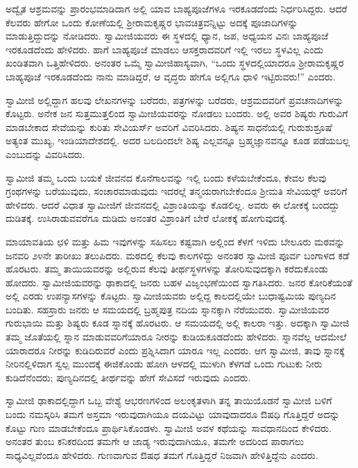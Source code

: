  ಅದ್ವೈತ ಆಶ್ರಮವನ್ನು ಪ್ರಾರಂಭಮಾಡಿದಾಗ ಅಲ್ಲಿ ಯಾವ ಬಾಹ್ಯಪೂಜೆಗಳೂ ಇರಕೂಡದೆಂದು ನಿರ್ಧರಿಸಿದ್ದರು. ಆದರೆ ಕೆಲವರು ಹೇಗೋ ಒಂದು ಕೋಣೆಯಲ್ಲಿ ಶ‍್ರೀರಾಮಕೃಷ್ಣರ ಭಾವಚಿತ್ರವನ್ನಿಟ್ಟು ಅದಕ್ಕೆ ಪೂಜಾದಿಗಳನ್ನು ಮಾಡುತ್ತಿದ್ದುದನ್ನು ನೋಡಿದರು. ಸ್ವಾಮೀಜಿಯವರು ಈ ಸ್ಥಳದಲ್ಲಿ ಧ್ಯಾನ, ಜಪ, ಅಧ್ಯಯನ ವಿನಃ ಬಾಹ್ಯಪೂಜೆ ಇರಕೂಡದೆಂದು ಹೇಳಿದರು. ಹಾಗೆ ಬಾಹ್ಯಪೂಜೆ ಮಾಡಲು ಆಸಕ್ತರಾದವರಿಗೆ ಇಲ್ಲಿ ಇರಲು ಸ್ಥಳವಿಲ್ಲ ಎಂದು ಖಂಡಿತವಾಗಿ ಒತ್ತಿಹೇಳಿದರು. ಅನಂತರ ಒಮ್ಮೆ ಸ್ವಾಮೀಜಿ\break ಹಾಸ್ಯವಾಗಿ, “ಒಂದು ಸ್ಥಳದಲ್ಲಿಯಾದರೂ ಶ‍್ರೀರಾಮಕೃಷ್ಣರ ಬಾಹ್ಯಪೂಜೆ ಇರಕೂಡದೆಂದು ನಾನು ಮಾಡಿದ್ದರೆ, ಆ ವೃದ್ಧರು ಹೇಗೊ ಅಲ್ಲಿಗೂ ಧಾಳಿ ಇಟ್ಟಿರುವರು!” ಎಂದರು. 

 ಸ್ವಾಮೀಜಿ ಅಲ್ಲಿದ್ದಾಗ ಹಲವು ಲೇಖನಗಳನ್ನು ಬರೆದರು, ಪತ್ರಗಳನ್ನು ಬರೆದರು, ಆಶ್ರಮದವರಿಗೆ ಪ್ರವಚನಾದಿಗಳನ್ನು ಕೊಟ್ಟರು. ಅನೇಕ ಜನ ಸುತ್ತಮುತ್ತಲಿಂದ ಸ್ವಾಮೀಜಿಯವರನ್ನು ನೋಡಲು ಬಂದರು. ಅಲ್ಲಿ ಅವರ ಶಿಷ್ಯರು ಗುರುವಿಗೆ ಮಾಡಬೇಕಾದ ಸೇವೆಯನ್ನು ಕುರಿತು ಸೇವಿಯರ್ಸ್ ಅವರಿಗೆ ವಿವರಿಸಿದರು. ಶಿಷ್ಯನ ಸಾಧನೆಯಲ್ಲಿ ಗುರುಶುಶ್ರೂಷೆ ಅತ್ಯಂತ ಮುಖ್ಯ, ಇಂಡಿಯಾದೇಶದಲ್ಲಿ. ಅದರ ಬಲದಿಂದಲೇ ಶಿಷ್ಯ ಎಲ್ಲವನ್ನೂ ಬ್ರಹ್ಮಜ್ಞಾನವನ್ನೂ ಕೂಡ ಪಡೆಯಬಲ್ಲ ಎಂಬುದನ್ನು ವಿವರಿಸಿದರು. 

 ಸ್ವಾಮೀಜಿ ತಮ್ಮ ಒಂದು ಬಯಕೆ ಜೀವನದ ಕೊನೆಗಾಲವನ್ನು ಇಲ್ಲಿ ಬಂದು ಕಳೆಯಬೇಕೆಂದೂ, ಕೇವಲ ಕೆಲವು ಗ್ರಂಥಗಳನ್ನು ಬರೆಯುವುದು, ಸಂಚಾರಮಾಡುವುದು ಇದರಲ್ಲೆ ತನ್ಮಯರಾಗಬೇಕೆಂದೂ ಶ‍್ರೀಮತಿ ಸೇವಿಯರ್ಸ್‍‍ ಅವರಿಗೆ ಹೇಳಿದರು. ಆದರೆ ವಿಧಾತ ಸ್ವಾಮೀಜಿಗೆ ಜೀವನದಲ್ಲಿ ವಿಶ್ರಾಂತಿಯನ್ನು ಕೊಡಲಿಲ್ಲ. ಅವರು ಈ ಲೋಕಕ್ಕೆ ಬಂದದ್ದು ದುಡಿತಕ್ಕೆ. ಉಸಿರಾಡುವವರೆಗೂ ದುಡಿದು ಅನಂತರ ವಿಶ್ರಾಂತಿಗೆ ಬೇರೆ ಲೋಕಕ್ಕೆ ಹೋಗುವುದಕ್ಕೆ. 

 ಮಾಯಾವತಿಯ ಛಳಿ ಮತ್ತು ಹಿಮ ಇವುಗಳನ್ನು ಸಹಿಸಲು ಕಷ್ಟವಾಗಿ ಅಲ್ಲಿಂದ ಕೆಳಗೆ ಇಳಿದು ಬೇಲೂರು ಮಠವನ್ನು ಜನವರಿ ೨೪ನೇ ತಾರೀಖು ತಲುಪಿದರು. ಮಠದಲ್ಲಿ ಕೆಲವು ಕಾಲಗಳಿದ್ದು ಅನಂತರ ಸ್ವಾಮೀಜಿ ಪೂರ್ವ ಬಂಗಾಳದ ಕಡೆ ಹೊರಟರು. ತಮ್ಮ ತಾಯಿಯವರನ್ನು ಅಲ್ಲಿರುವ ಕೆಲವು ತೀರ್ಥಸ್ಥಳಗಳನ್ನು ತೋರಿಸುವುದಕ್ಕಾಗಿ ಕರೆದುಕೊಂಡು ಹೋದರು. ಸ್ವಾಮೀಜಿಯವರನ್ನು ಢಾಕಾದಲ್ಲಿ ಜನರು ಬಹಳ ವಿಜೃಂಭಣೆಯಿಂದ ಸ್ವಾಗತಿಸಿದರು. ಜನರ ಕೋರಿಕೆಯಂತೆ ಅಲ್ಲಿ ಎರಡು ಉಪನ್ಯಾಸಗಳನ್ನು ಕೊಟ್ಟರು. ಸ್ವಾಮೀಜಿಯವರು ಅಲ್ಲಿದ್ದ ಕಾಲದಲ್ಲಿಯೇ ಬುಧಾಷ್ಟಮಿಯ ಪುಣ್ಯದಿನ ಬಂದಿತು. ಸಹಸ್ರಾರು ಜನರು ಆ ಸಮಯದಲ್ಲಿ ಬ್ರಹ್ಮಪುತ್ರ ನದಿಯ ಸ್ನಾನಕ್ಕಾಗಿ ನೆರೆಯುವರು. ಸ್ವಾಮೀಜಿಯವರ ಗುರುಭಾಯಿ ಮತ್ತು ಶಿಷ್ಯರು ಕೂಡ ಸ್ನಾನಕ್ಕೆ ಹೊರಟರು. ಆ ಸಮಯದಲ್ಲಿ ಅಲ್ಲಿ ಕಾಲರಾ ಇತ್ತು. ಅದಕ್ಕಾಗಿ ಸ್ವಾಮೀಜಿ ತಮ್ಮ ಜೊತೆಯಲ್ಲಿ ಸ್ನಾನ ಮಾಡುವವರಿಗೆ\break ಯಾರೂ ನೀರನ್ನು ಕುಡಿಯಕೂಡದೆಂದು ಹೇಳಿದರು. ಸ್ನಾನವೆಲ್ಲ ಆದಮೇಲೆ ಯಾರಾದರೂ ನೀರನ್ನು ಕುಡಿದಿರುವರೆ ಎಂದು ಪ್ರಶ್ನಿಸಿದಾಗ ಯಾರೂ ಇಲ್ಲ ಎಂದರು. ಆಗ ಸ್ವಾಮೀಜಿ, ತಾವು ಸ್ನಾನಕ್ಕೆ ನೀರಿನಲ್ಲಿಳಿದಾಗ ಸ್ವಲ್ಪ ಮುಂದಕ್ಕೆ ಈಜಿಕೊಂಡು ಹೋಗಿ ಆಳದಲ್ಲಿ ಮುಳುಗಿ ಕೆಳಗಡೆ ಒಂದು ಗುಟುಕು ನೀರು ಕುಡಿದೆನೆಂದರು; ಪುಣ್ಯದಿನದಲ್ಲಿ ತೀರ್ಥವನ್ನು ಹೇಗೆ ಸೇವಿಸದೆ ಇರುವುದು ಎಂದರು. 

 ಸ್ವಾಮೀಜಿ ಢಾಕಾದಲ್ಲಿದ್ದಾಗ ಒಬ್ಬ ವೇಶ್ಯೆ ಆಭರಣಗಳಿಂದ ಅಲಂಕೃತಳಾಗಿ ತನ್ನ ತಾಯಿಯೊಡನೆ ಸ್ವಾಮೀಜಿ ಬಳಿಗೆ ಬಂದು ನಮಸ್ಕರಿಸಿ ತಮಗೆ ಅಸ್ತಮಾ ಇರುವುದಾಗಿಯೂ ದಯವಿಟ್ಟು ಯಾವುದಾದರೂ ಔಷಧಿ ಗೊತ್ತಿದ್ದರೆ ಅದನ್ನು ಕೊಟ್ಟು ಗುಣ ಮಾಡಬೇಕೆಂದೂ‌ ಪ್ರಾರ್ಥಿಸಿಕೊಂಡಳು. ಸ್ವಾಮೀಜಿ ಅವಳ ಕಥೆಯನ್ನು ಸಾವಧಾನದಿಂದ ಕೇಳಿದರು. ಅನಂತರ ತುಂಬ ಕನಿಕರದಿಂದ ತಮಗೇ ಆ ಜಾಡ್ಯ ಇರುವುದಾಗಿಯೂ, ತಮಗೇ ಅದರಿಂದ ಪಾರಾಗಲು ಸಾಧ್ಯವಿಲ್ಲವೆಂದೂ ಹೇಳಿದರು. ಗುಣವಾಗುವ ಔಷಧ ತಮಗೆ ಗೊತ್ತಿದ್ದರೆ ನಿಜವಾಗಿ ಹೇಳಿತ್ತಿದ್ದೆನು ಎಂದರು. 

